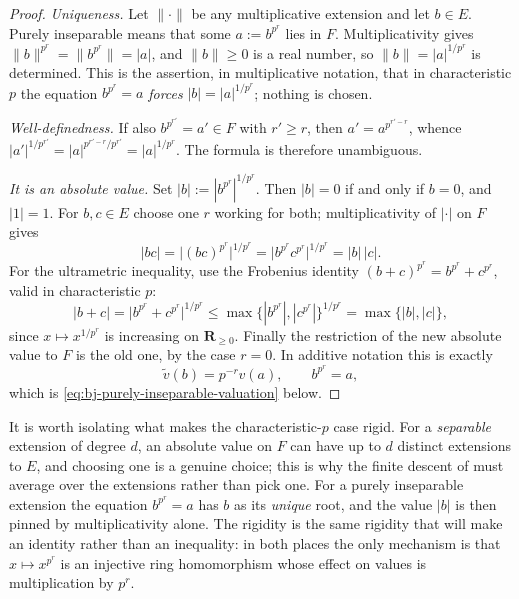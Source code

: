 \begin{proof}
\emph{Uniqueness.}  Let $\lVert\cdot\rVert$ be any multiplicative
extension and let $b\in E$.  Purely inseparable means that some
$a:=b^{p^r}$ lies in $F$.  Multiplicativity gives
$\lVert b\rVert^{p^r}=\lVert b^{p^r}\rVert=|a|$, and $\lVert b\rVert\ge0$
is a real number, so $\lVert b\rVert=|a|^{1/p^r}$ is determined.  This is
the assertion, in multiplicative notation, that in characteristic $p$ the
equation $b^{p^r}=a$ \emph{forces} $|b|=|a|^{1/p^r}$; nothing is chosen.

\emph{Well-definedness.}  If also $b^{p^{r'}}=a'\in F$ with $r'\ge r$,
then $a'=a^{p^{r'-r}}$, whence
$|a'|^{1/p^{r'}}=|a|^{p^{r'-r}/p^{r'}}=|a|^{1/p^r}$.  The formula is
therefore unambiguous.

\emph{It is an absolute value.}  Set $|b|:=|b^{p^r}|^{1/p^r}$.  Then
$|b|=0$ if and only if $b=0$, and $|1|=1$.  For $b,c\in E$ choose one
$r$ working for both; multiplicativity of $|\cdot|$ on $F$ gives
\[
 |bc|=\bigl|(bc)^{p^r}\bigr|^{1/p^r}
     =\bigl|b^{p^r}c^{p^r}\bigr|^{1/p^r}
     =|b|\,|c|.
\]
For the ultrametric inequality, use the Frobenius identity
$(b+c)^{p^r}=b^{p^r}+c^{p^r}$, valid in characteristic $p$:
\[
 |b+c|=\bigl|b^{p^r}+c^{p^r}\bigr|^{1/p^r}
      \le\max\bigl\{|b^{p^r}|,|c^{p^r}|\bigr\}^{1/p^r}
      =\max\{|b|,|c|\},
\]
since $x\mapsto x^{1/p^r}$ is increasing on $\mathbf R_{\ge0}$.
Finally the restriction of the new absolute value to $F$ is the old one,
by the case $r=0$.  In additive notation this is exactly
\[
 \widetilde v(b)=p^{-r}v(a),
 \qquad b^{p^r}=a,
\]
which is \eqref{eq:bj-purely-inseparable-valuation} below.
\end{proof}

\begin{remark}
\label{rem:ch43-forced-formula}
It is worth isolating what makes the characteristic-$p$ case rigid.  For a
\emph{separable} extension of degree $d$, an absolute value on $F$ can
have up to $d$ distinct extensions to $E$, and choosing one is a genuine
choice; this is why the finite descent of 
must average over the extensions rather than pick one.  For a purely
inseparable extension the equation $b^{p^r}=a$ has $b$ as its
\emph{unique} root, and the value $|b|$ is then pinned by
multiplicativity alone.  The rigidity is the same rigidity that will make
 an identity rather than an inequality:
in both places the only mechanism is that $x\mapsto x^{p^r}$ is an
injective ring homomorphism whose effect on values is multiplication
by $p^r$.
\end{remark}

